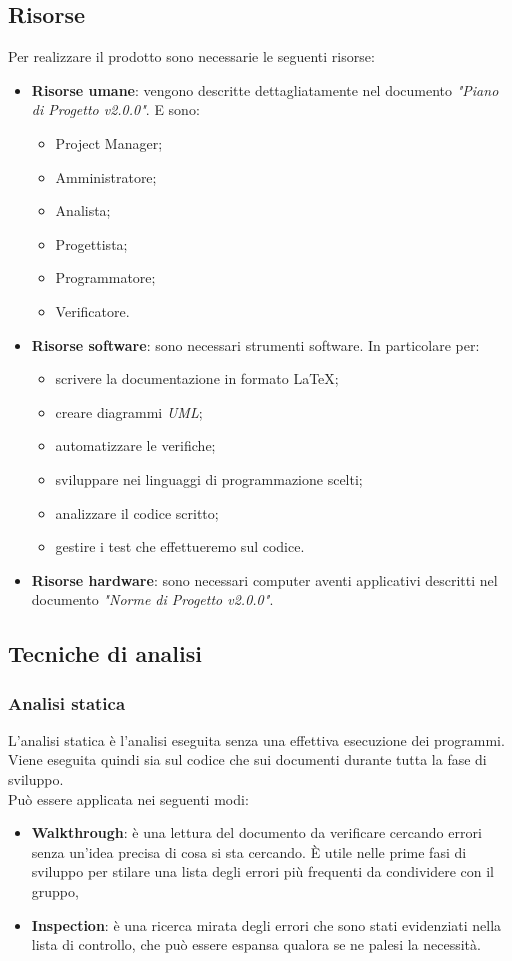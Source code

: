 \documentclass[12pt,a4paper,titlepage]{article}
\begin{document}
	\subsection{Risorse}
	Per realizzare il prodotto sono necessarie le seguenti risorse:
	\begin{itemize}
		\item \textbf{Risorse umane}: vengono descritte dettagliatamente nel documento \textit{"Piano di Progetto v2.0.0"}. E sono:
		\begin{itemize}
			\item Project Manager;
			\item Amministratore;
			\item Analista;
			\item Progettista;
			\item Programmatore;
			\item Verificatore.
		\end{itemize}
		\item \textbf{Risorse software}: sono necessari strumenti software. In particolare per:
		\begin{itemize}
			\item scrivere la documentazione in formato \LaTeX;
			\item creare diagrammi \textit{UML};
			\item automatizzare le verifiche;
			\item sviluppare nei linguaggi di programmazione scelti;
			\item analizzare il codice scritto;
			\item gestire i test che effettueremo sul codice.
		\end{itemize}
		\item \textbf{Risorse hardware}: sono necessari computer aventi applicativi descritti nel documento \textit{"Norme di Progetto v2.0.0"}. 
	\end{itemize}

	\subsection{Tecniche di analisi}
		\subsubsection{Analisi statica}
		L'analisi statica è l'analisi eseguita senza una effettiva esecuzione dei programmi. Viene eseguita quindi sia sul codice che sui documenti durante tutta la fase di sviluppo.\\
		Può essere applicata nei seguenti modi:
		\begin{itemize}
			\item \textbf{Walkthrough}: è una lettura del documento da verificare cercando errori senza un'idea precisa di cosa si sta cercando. È utile nelle prime fasi di sviluppo per stilare una lista degli errori più frequenti da condividere con il gruppo,
			\item \textbf{Inspection}: è una ricerca mirata degli errori che sono stati evidenziati nella lista di controllo, che può essere espansa qualora se ne palesi la necessità.
		\end{itemize}
	
\end{document}

